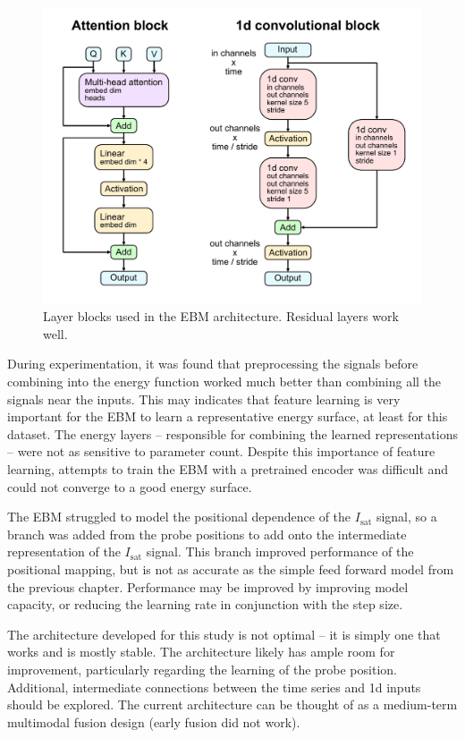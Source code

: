 \begin{figure}
	\centering
	\includegraphics[width=\linewidth]{figures/architecture_blocks.pdf}
	\caption{\label{fig:architecture_blocks}Layer blocks used in the EBM architecture. Residual layers work well.}
\end{figure}

During experimentation, it was found that preprocessing the signals before combining into the energy function worked much better than combining all the signals near the inputs. This may indicates that feature learning is very important for the EBM to learn a representative energy surface, at least for this dataset. The energy layers -- responsible for combining the learned representations -- were not as sensitive to parameter count. Despite this importance of feature learning, attempts to train the EBM with a pretrained encoder was difficult and could not converge to a good energy surface.

The EBM struggled to model the positional dependence of the $I_\text{sat}$ signal, so a branch was added from the probe positions to add onto the intermediate representation of the $I_\text{sat}$ signal. This branch improved performance of the positional mapping, but is not as accurate as the simple feed forward model from the previous chapter. Performance may be improved by improving model capacity, or reducing the learning rate in conjunction with the step size. 

The architecture developed for this study is not optimal -- it is simply one that works and is mostly stable. The architecture likely has ample room for improvement, particularly regarding the learning of the probe position. Additional, intermediate connections between the time series and 1d inputs should be explored. The current architecture can be thought of as a medium-term multimodal fusion design (early fusion did not work). 


